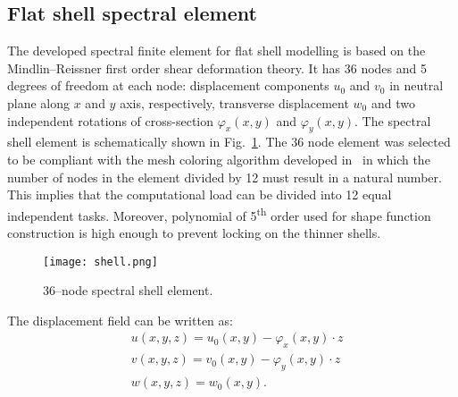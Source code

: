\documentclass[preprint,12pt]{elsarticle}
\begin{document}
	\subsection{Flat shell spectral element}
	
	The developed spectral finite element for flat shell modelling is based on the Mindlin--Reissner first order shear deformation theory. It has 36 nodes and 5 degrees of freedom at each node: displacement components $u_0$ and $v_0$ in neutral plane along $x$ and $y$ axis, respectively, transverse displacement $w_0$ and two independent rotations of cross-section $\varphi_x(x,y)$ and $\varphi_y(x,y)$. The spectral shell element is schematically shown in Fig.~\ref{fig:spectral_shell_element}. The 36 node element was selected to be compliant with the mesh coloring algorithm developed in~\cite{Kudela2016} in which the number of nodes in the element divided by 12 must result in a natural number. This implies that the computational load can be divided into 12 equal independent tasks. Moreover, polynomial of 5\textsuperscript{th} order used for shape function construction is high enough to prevent locking on the thinner shells.
	\begin{figure} [h!]
		\centering
		\texttt{[image: shell.png]}	
		\caption{36--node spectral shell element.}
		\label{fig:spectral_shell_element}
	\end{figure}

	The displacement field can be written as:
	\begin{equation}
	\begin{split}
	& u(x,y,z)=u_0(x,y) - \varphi_x(x,y) \cdot z\\
	& v(x,y,z)=v_0(x,y) - \varphi_y(x,y) \cdot z\\
	& w(x,y,z)=w_0(x,y). \label{eq:delam_platedispl}
	\end{split}
	\end{equation}
	
\end{document}
